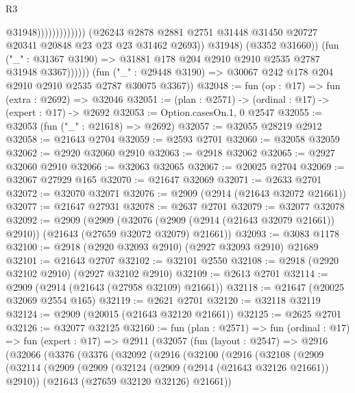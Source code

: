 \begin{lexlean}{R3}
\begin{coremodule}
                                                @31948)))))))))))))
                      (@26243
                        @2878
                        @2881
                        @2751
                        @31448
                        @31450
                        @20727
                        @20341
                        @20848
                        @23
                        @23
                        @23
                        @31462
                        @2693))
                    @31948)
                  (@3352 @31660))
                (fun ("_" : @31367 @3190) =>
                @31881 @178 @204 @2910 @2910 @2535 @2787 @31948 @3367))))))
      (fun ("_" : @29448 @3190) => @30067 @242 @178 @204 @2910 @2910 @2535 @2787 @30075 @3367))
@32048 := fun (op : @17) => fun (extra : @2692) => @32046
@32051 := (plan : @2571) -> (ordinal : @17) -> (expert : @17) -> @2692
@32053 := Option.casesOn.{1, 0} @2547
@32055 := @32053 (fun ("_" : @21618) => @2692)
@32057 := @32055 @28219 @2912
@32058 := @21643 @2704
@32059 := @2593 @2701
@32060 := @32058 @32059
@32062 := @2920 @32060 @2910
@32063 := @2918 @32062
@32065 := @2927 @32060 @2910
@32066 := @32063 @32065
@32067 := @20025 @2704
@32069 := @32067 @27929 @165
@32070 := @21647 @32069
@32071 := @2633 @2701
@32072 := @32070 @32071
@32076 := @2909 (@2914 (@21643 @32072 @21661))
@32077 := @21647 @27931
@32078 := @2637 @2701
@32079 := @32077 @32078
@32092 := @2909
    (@2909
      (@32076 (@2909 (@2914 (@21643 @32079 @21661)) @2910))
      (@21643 (@27659 @32072 @32079) @21661))
@32093 := @3083 @1178
@32100 := @2918 (@2920 @32093 @2910) (@2927 @32093 @2910) @21689
@32101 := @21643 @2707
@32102 := @32101 @2550
@32108 := @2918 (@2920 @32102 @2910) (@2927 @32102 @2910)
@32109 := @2613 @2701
@32114 := @2909 (@2914 (@21643 (@27958 @32109) @21661))
@32118 := @21647 (@20025 @32069 @2554 @165)
@32119 := @2621 @2701
@32120 := @32118 @32119
@32124 := @2909 (@20015 (@21643 @32120 @21661))
@32125 := @2625 @2701
@32126 := @32077 @32125
@32160 := fun (plan : @2571) =>
  fun (ordinal : @17) =>
  fun (expert : @17) =>
  @2911
    (@32057
      (fun (layout : @2547) =>
      @2916
        (@32066
          (@3376
            (@3376
              (@32092
                (@2916
                  (@32100
                    (@2916
                      (@32108
                        (@2909
                          (@32114
                            (@2909
                              (@2909
                                (@32124 (@2909 (@2914 (@21643 @32126 @21661)) @2910))
                                (@21643 (@27659 @32120 @32126) @21661))

\end{coremodule}
\end{lexlean}
